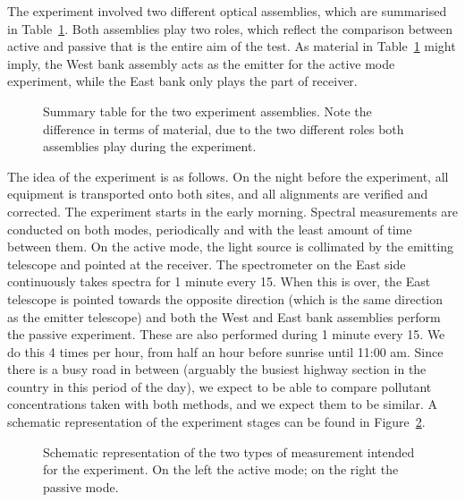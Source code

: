 The experiment involved two different optical assemblies, which are
summarised in Table~\ref{tab:assemblies}. Both assemblies play two
roles, which reflect the comparison between active and passive that is
the entire aim of the test. As material in Table~\ref{tab:assemblies}
might imply, the West bank assembly acts as the emitter for the active
mode experiment, while the East bank only plays the part of receiver.

\begin{figure}[htpb]
    \centering
    \caption{Summary table for the two experiment assemblies. Note the
    difference in terms of material, due to the two different roles both
    assemblies play during the experiment.}
    \label{tab:assemblies}
    \missingfigure{}
\end{figure}


The idea of the experiment is as follows. On the night before the
experiment, all equipment is transported onto both sites, and all
alignments are verified and corrected. The experiment starts in the
early morning. Spectral measurements are conducted on both modes,
periodically and with the least amount of time between them. On the
active mode, the light source is collimated by the emitting telescope
and pointed at the receiver. The spectrometer on the East side
continuously takes spectra for 1 minute every 15. When this is over, the
East telescope is pointed towards the opposite direction (which is the
same direction as the emitter telescope) and both the West and East
bank assemblies perform the passive experiment. These are also performed
during 1 minute every 15. We do this 4 times per hour, from half an hour
before sunrise until 11:00 am. Since there is a busy road in between
(arguably the busiest highway section in the country in this period of
the day), we expect to be able to compare pollutant concentrations taken
with both methods, and we expect them to be similar. A schematic
representation of the experiment stages can be found in
Figure~\ref{fig:experiment_schematic}.
\begin{figure}[htpb]
    \centering
    \missingfigure{}
    \caption{Schematic representation of the two types of measurement
    intended for the experiment. On the left the active mode; on the
    right the passive mode.}
    \label{fig:experiment_schematic}
\end{figure}
